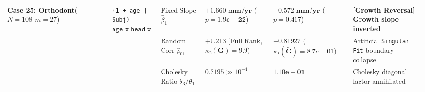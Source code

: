 \begin{table}[htbp]
\begin{tabular}{llllll}
\multirow{3}{*}{\textbf{Case 25: Orthodont}\newline \cite{Potthoff1964}\newline ($N=108, m=27$)}
 & \multirow{3}{*}{\texttt{(1 + age | Subj)}\newline $\texttt{age x head\_w}$}
 & Fixed Slope $\hat{\beta}_1$ & $\bm{+0.660\text{ mm/yr}}$ ($p = \bm{1.9e-22}$) & $\bm{-0.572\text{ mm/yr}}$ ($p = \bm{0.417}$) & \textbf{[Growth Reversal] Growth slope inverted} \\
 & & Random Corr $\hat{\rho}_{01}$ & $\bm{+0.213}$ (Full Rank, $\kappa_2(\mathbf{G})=9.9$) & $\bm{-0.81927}$ ($\kappa_2(\tilde{\mathbf{G}})=8.7e+01$) & Artificial \texttt{Singular Fit} boundary collapse \\
 & & Cholesky Ratio $\theta_3/\theta_1$ & $\bm{0.3195} \gg 10^{-4}$ & $\bm{1.10e-01}$ & Cholesky diagonal factor annihilated \\
\bottomrule
\end{tabular}
\end{table}
